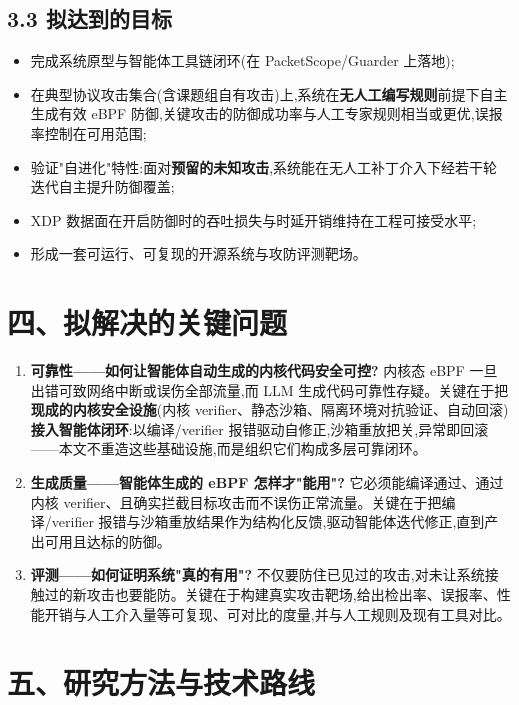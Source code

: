 \subsection*{3.3 拟达到的目标}
\begin{itemize}[leftmargin=2em,itemsep=1pt,topsep=2pt]
  \item 完成系统原型与智能体工具链闭环(在 PacketScope/Guarder 上落地);
  \item 在典型协议攻击集合(含课题组自有攻击)上,系统在\textbf{无人工编写规则}前提下自主生成有效 eBPF 防御,关键攻击的防御成功率与人工专家规则相当或更优,误报率控制在可用范围;
  \item 验证"自进化"特性:面对\textbf{预留的未知攻击},系统能在无人工补丁介入下经若干轮迭代自主提升防御覆盖;
  \item XDP 数据面在开启防御时的吞吐损失与时延开销维持在工程可接受水平;
  \item 形成一套可运行、可复现的开源系统与攻防评测靶场。
\end{itemize}
\section*{四、拟解决的关键问题}
\begin{enumerate}[leftmargin=2em,itemsep=1pt,topsep=2pt]
  \item \textbf{可靠性——如何让智能体自动生成的内核代码安全可控?} 内核态 eBPF 一旦出错可致网络中断或误伤全部流量,而 LLM 生成代码可靠性存疑\supercite{seccodegen2025}。关键在于把\textbf{现成的内核安全设施}(内核 verifier、静态沙箱、隔离环境对抗验证、自动回滚)\textbf{接入智能体闭环}:以编译/verifier 报错驱动自修正,沙箱重放把关,异常即回滚——本文不重造这些基础设施,而是组织它们构成多层可靠闭环。
  \item \textbf{生成质量——智能体生成的 eBPF 怎样才"能用"?} 它必须能编译通过、通过内核 verifier、且确实拦截目标攻击而不误伤正常流量。关键在于把编译/verifier 报错与沙箱重放结果作为结构化反馈,驱动智能体迭代修正,直到产出可用且达标的防御。
  \item \textbf{评测——如何证明系统"真的有用"?} 不仅要防住已见过的攻击,对未让系统接触过的新攻击也要能防。关键在于构建真实攻击靶场,给出检出率、误报率、性能开销与人工介入量等可复现、可对比的度量,并与人工规则及现有工具对比。
\end{enumerate}
\section*{五、研究方法与技术路线}

